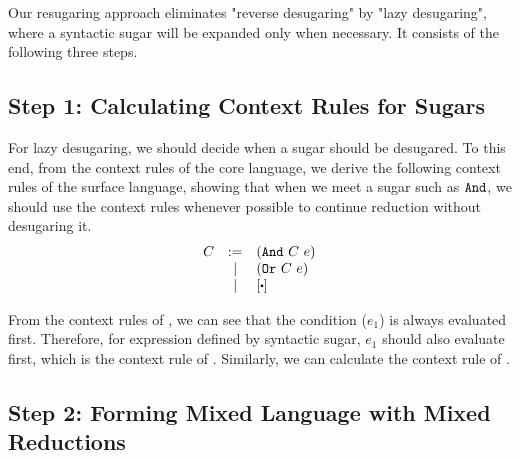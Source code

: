Our resugaring approach eliminates "reverse desugaring" by "lazy desugaring", where a syntactic sugar will be expanded only when necessary. It consists of the following three steps.

\subsection*{Step 1: Calculating Context Rules for Sugars}

For lazy desugaring, we should decide when a sugar should be desugared. To this end, from the context rules of the core language, we derive the following context rules of the surface language, showing that when we meet a sugar such as $\mbox{\tt And}$, we should use the context rules whenever possible to continue reduction without desugaring it.
\[
\begin{array}{lcl}
C &:=& (\m{And}~C~e)\\
&|& (\m{Or}~C~e)\\
&|&[\bigcdot]\\
\end{array}
\]

From the context rules of , we can see that the condition ($e_1$) is always evaluated first. Therefore, for expression  defined by syntactic sugar, $e_1$ should also evaluate first, which is the context rule of . Similarly, we can calculate the context rule of .

\subsection*{Step 2: Forming Mixed Language with Mixed Reductions}

